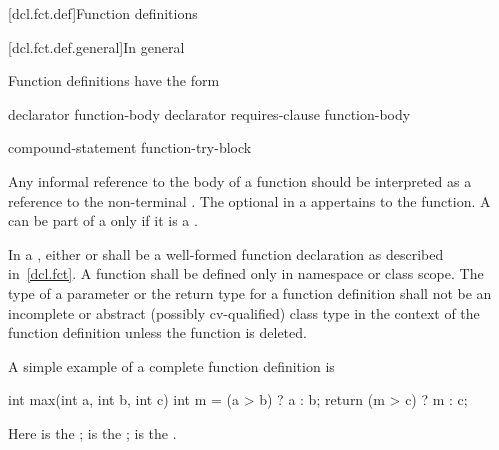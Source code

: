 [dcl.fct.def]{Function definitions}%

[dcl.fct.def.general]{In general}

\pnum
{}%
Function definitions have the form
%
%
\begin{bnf}
\br
      declarator  function-body\br
      declarator requires-clause function-body
\end{bnf}

\begin{bnf}
\br
     compound-statement\br
    function-try-block\br
    \terminal{=}  \terminal{;}\br
    \terminal{=}  \terminal{;}
\end{bnf}

Any informal reference to the body of a function should be interpreted as a reference to
the non-terminal .
The optional  in a 
appertains to the function.
A  can be part of a 
only if it is a .

\pnum
In a ,
either   \tcode{;}
or  \tcode{;}
shall be a well-formed function declaration
as described in~\ref{dcl.fct}.
A function shall be defined only in namespace or class scope.
The type of a parameter or the return type for a function
definition shall not be
an incomplete or abstract (possibly cv-qualified) class type
in the context of the function definition
unless the function is deleted.

\pnum
\begin{example}
A simple example of a complete function definition is
\begin{codeblock}
int max(int a, int b, int c) {
  int m = (a > b) ? a : b;
  return (m > c) ? m : c;
}
\end{codeblock}

Here
is the
;
is the
;
\tcode{\{ \commentellip{} \}}
is the
.
\end{example}

